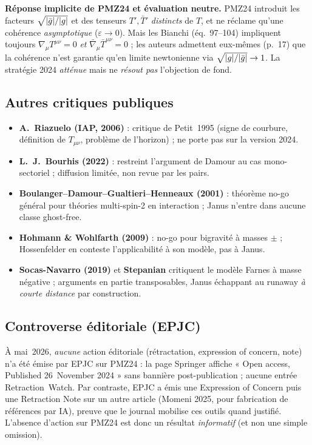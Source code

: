 \documentclass[11pt,a4paper]{article}
\theoremstyle{definition}
\theoremstyle{plain}
\newcommand{\gbar}{\bar{g}}
\newcommand{\nablabar}{\bar{\nabla}}
\newcommand{\Tbar}{\bar{T}}
\newcommand{\Tbarp}{\bar{T}'}
\newcommand{\eqpaper}[1]{\textsf{(éq.~#1)}}   %
\begin{document}
\textbf{Réponse implicite de PMZ24 et évaluation neutre.} PMZ24 introduit les facteurs
$\sqrt{\abs{\gbar}/\abs{g}}$ et des tenseurs $T',\Tbarp$ \emph{distincts} de $T$, et ne réclame
qu'une cohérence \emph{asymptotique} ($\varepsilon\to0$). Mais les Bianchi \eqpaper{97--104}
impliquent toujours $\nabla_\mu T^{\mu\nu}=0$ \emph{et} $\nablabar_\mu\Tbar^{\mu\nu}=0$ ; les
auteurs admettent eux-mêmes (p.~17) que la cohérence n'est garantie qu'en limite newtonienne
via $\sqrt{\abs{g}/\abs{\gbar}}\to1$. La stratégie 2024 \emph{atténue} mais ne \emph{résout pas}
l'objection de fond.

\subsection{Autres critiques publiques}

\begin{itemize}[leftmargin=1.4em]
\item \textbf{A.~Riazuelo (IAP, 2006)} : critique de Petit~1995 (signe de courbure, définition de
$T_{\mu\nu}$, problème de l'horizon) ; ne porte pas sur la version 2024.
\item \textbf{L.~J.~Bourhis (2022)} \cite{Bourhis2022} : restreint l'argument de Damour au cas
mono-sectoriel ; diffusion limitée, non revue par les pairs.
\item \textbf{Boulanger–Damour–Gualtieri–Henneaux (2001)} : théorème no-go général pour
théories multi-spin-2 en interaction ; Janus n'entre dans aucune classe ghost-free.
\item \textbf{Hohmann \& Wohlfarth (2009)} \cite{Hohmann2009} : no-go pour bigravité à masses
$\pm$ ; Hossenfelder \cite{Hossenfelder2009} en conteste l'applicabilité à son modèle, pas à Janus.
\item \textbf{Socas-Navarro (2019)} \cite{SocasNavarro2019} et \textbf{Stepanian} \cite{Stepanian2019}
critiquent le modèle Farnes à masse négative ; arguments en partie transposables, Janus
échappant au runaway \emph{à courte distance} par construction.
\end{itemize}

\subsection{Controverse éditoriale (EPJC)}

À mai~2026, \emph{aucune} action éditoriale (rétractation, expression of concern, note) n'a été
émise par EPJC sur PMZ24 : la page Springer affiche « Open access, Published 26~November 2024 »
sans bannière post-publication ; aucune entrée Retraction~Watch. Par contraste, EPJC a émis une
Expression of Concern puis une Retraction Note sur un autre article (Momeni 2025, pour
fabrication de références par IA), preuve que le journal mobilise ces outils quand justifié.
L'absence d'action sur PMZ24 est donc un résultat \emph{informatif} (et non une simple omission).
\end{document}
